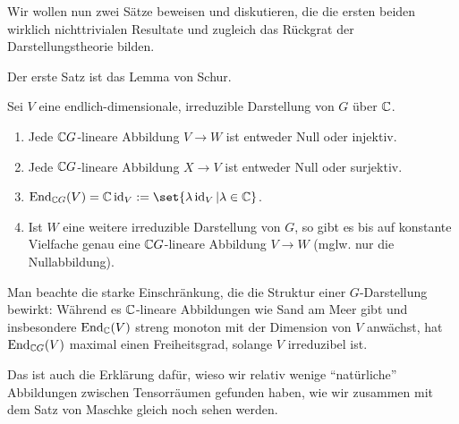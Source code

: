 \begin{remark}
Wir wollen nun zwei Sätze beweisen und diskutieren, die die ersten beiden wirklich nichttrivialen Resultate und zugleich das Rückgrat der Darstellungstheorie bilden.

Der erste Satz ist das Lemma von Schur.
\end{remark}

\begin{theorem}
Sei $V$ eine endlich-dimensionale, irreduzible Darstellung von $G$ über $\mathbb{C}$.
\begin{enumerate}
\item Jede $\mathbb{C} G$-lineare Abbildung $V\to W$ ist entweder Null oder injektiv.
\item Jede $\mathbb{C} G$-lineare Abbildung $X\to V$ ist entweder Null oder surjektiv.
\item $\End_{\IC G}(V) = \IC\id_V := \set{\lambda\id_V | \lambda\in\IC}$.
\item Ist $W$ eine weitere irreduzible Darstellung von $G$, so gibt es bis auf konstante Vielfache genau eine $\mathbb{C} G$-lineare Abbildung $V\to W$ (mglw. nur die Nullabbildung).
\end{enumerate}
\end{theorem}

\begin{remark}
Man beachte die starke Einschränkung, die die Struktur einer $G$-Darstellung bewirkt: Während es $\mathbb{C}$-lineare Abbildungen wie Sand am Meer gibt und insbesondere $\operatorname{End}_{\mathbb{C}}(V)$ streng monoton mit der Dimension von $V$ anwächst, hat $\operatorname{End}_{\mathbb{C} G}(V)$ maximal einen Freiheitsgrad, solange $V$ irreduzibel ist.

Das ist auch die Erklärung dafür, wieso wir relativ wenige \enquote{natürliche} Abbildungen zwischen Tensorräumen gefunden haben, wie wir zusammen mit dem Satz von Maschke gleich noch sehen werden.
\end{remark}

